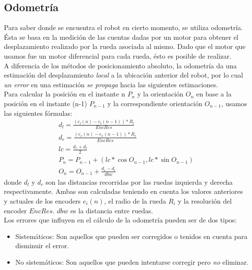 \subsection{Odometr\'ia}
\label{odometry}
Para saber donde se encuentra el robot en cierto momento, se utiliza odometr\'ia.
\\
\'Esta se basa en la medici\'on de las cuentas dadas por un motor para obtener el desplazamiento realizado 
por la rueda asociada al mismo. Dado que el motor que usamos fue un motor diferencial para cada rueda,
\'esto es posible de realizar.
\\
A diferencia de los m\'etodos de posicionamiento absoluto, la odometr\'ia
da una estimaci\'on del desplazamiento \emph{local} a la ubicaci\'on anterior del robot, por lo cual \emph{un error}
en una estimaci\'on \emph{se propaga} hacia las siguientes estimaciones. 
\\
Para calcular la posici\'on en el instante n $P_n$ y la orientaci\'on $O_n$ en base a la posici\'on en el 
instante (n-1) $P_{n-1}$ y la correspondiente orientaci\'on $O_{n-1}$, usamos las siguientes f\'ormulas:
\begin{eqnarray}
d_l = \frac{(e_l(n) - e_l(n-1)) * R_l}{EncRes} \\
d_r = \frac{(e_r(n) - e_r(n-1)) * R_r}{EncRes} \\
lc = \frac{d_r + d_l}{2} \\
P_n = P_{n-1} + (lc * \cos{O_{n-1}},lc * \sin{O_{n-1}}) \\
O_n = O_{n-1} + \frac{d_r - d_l}{dbw}
\end{eqnarray}
donde $d_l$ y $d_r$ son las distancias recorridas por las ruedas izquierda y derecha respectivamente. Ambas
son calculadas teniendo en cuenta los valores anteriores y actuales de los encoders $e_i(n)$, el radio de la rueda $R_i$ y
la resoluci\'on del encoder $EncRes$. $dbw$ es la distancia entre ruedas.
\\
Los errores que influyen en el c\'alculo de la odometr\'ia pueden ser de dos tipos:

\begin{itemize}

\item{Sistem\'aticos:} Son aquellos que pueden ser corregidos o tenidos en cuenta para disminuir el error.

\item{No sistem\'aticos:} Son aquellos que pueden intentarse corregir pero \emph{no} eliminar.

\end{itemize}

